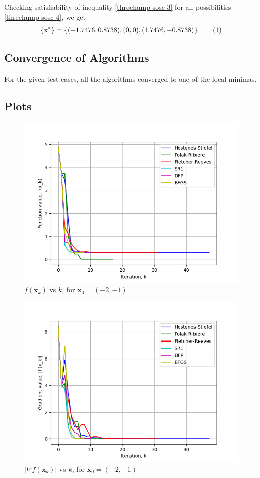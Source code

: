 \documentclass[a4paper]{article}
\newcommand\numberthis{\addtocounter{equation}{1}\tag{\theequation}}
\begin{document}
Checking satisfiability of inequality \eqref{threehump-sosc-3} for all possibilities \eqref{threehump-sosc-4}, we get
\begin{align*}
\left\{\textbf{x}^*\right\} = \left\{(-1.7476, 0.8738), (0, 0), (1.7476, -0.8738)\right\} \numberthis \label{threehump-minima}
\end{align*}

\subsection{Convergence of Algorithms}

For the given test cases, all the algorithms converged to one of the local minimas.

\subsection{Plots}

\begin{figure}[H]
    \centering
    \includegraphics[width=.65\textwidth]{images/three_hump_camel_function_vals.png}
    \caption{$f(\textbf{x}_k)$ vs $k$, for $\textbf{x}_0 = (-2, -1)$}
\end{figure}

\begin{figure}[H]
    \centering
    \includegraphics[width=.65\textwidth]{images/three_hump_camel_function_grad.png}
    \caption{$|\nabla f(\textbf{x}_k)|$ vs $k$, for $\textbf{x}_0 = (-2, -1)$}
\end{figure}
\end{document}
